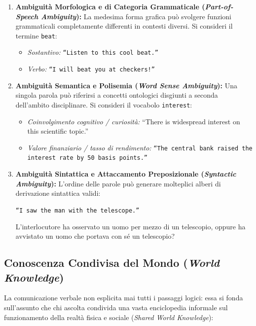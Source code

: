 \begin{enumerate}
    \item \textbf{Ambiguit\`a Morfologica e di Categoria Grammaticale (\textit{Part-of-Speech Ambiguity}):}
    La medesima forma grafica pu\`o svolgere funzioni grammaticali completamente differenti in contesti diversi. Si consideri il termine \texttt{beat}:
    \begin{itemize}
        \item \textit{Sostantivo:} \texttt{``Listen to this cool beat.''}
        \item \textit{Verbo:} \texttt{``I will beat you at checkers!''}
    \end{itemize}
    \item \textbf{Ambiguit\`a Semantica e Polisemia (\textit{Word Sense Ambiguity}):}
    Una singola parola pu\`o riferirsi a concetti ontologici disgiunti a seconda dell'ambito disciplinare. Si consideri il vocabolo \texttt{interest}:
    \begin{itemize}
        \item \textit{Coinvolgimento cognitivo / curiosit\`a:} ``There is widespread interest on this scientific topic.''
        \item \textit{Valore finanziario / tasso di rendimento:} \texttt{``The central bank raised the interest rate by 50 basis points.''}
    \end{itemize}
    \item \textbf{Ambiguit\`a Sintattica e Attaccamento Preposizionale (\textit{Syntactic Ambiguity}):}
    L'ordine delle parole pu\`o generare molteplici alberi di derivazione sintattica validi:
    \begin{center}
    \texttt{``I saw the man with the telescope.''}
    \end{center}
    L'interlocutore ha osservato un uomo per mezzo di un telescopio, oppure ha avvistato un uomo che portava con sé un telescopio?
\end{enumerate}

\FloatBarrier
\subsection{Conoscenza Condivisa del Mondo (\textit{World Knowledge})}
\label{subsec:world-knowledge}

La comunicazione verbale non esplicita mai tutti i passaggi logici: essa si fonda sull'assunto che chi ascolta condivida una vasta enciclopedia informale sul funzionamento della realt\`a fisica e sociale (\textit{Shared World Knowledge}):

